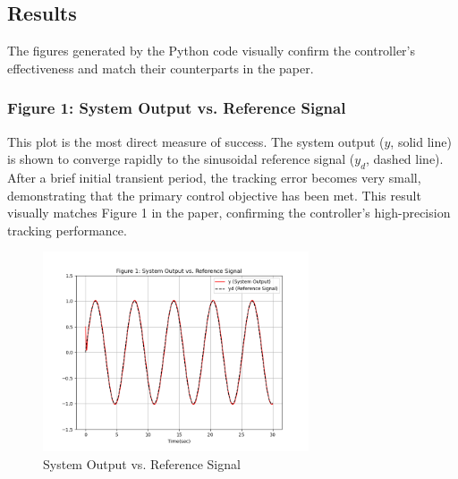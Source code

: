 \FloatBarrier
\subsection{Results}
The figures generated by the Python code visually confirm the controller's effectiveness and match their counterparts in the paper.

\subsubsection{Figure 1: System Output vs. Reference Signal}
 This plot is the most direct measure of success. The system output ($y$, solid line) is shown to converge rapidly to the sinusoidal reference signal ($y_d$, dashed line). After a brief initial transient period, the tracking error becomes very small, demonstrating that the primary control objective has been met. This result visually matches Figure 1 in the paper, confirming the controller's high-precision tracking performance.
\begin{figure}[H]
	\centering
	\includegraphics[width=0.7\textwidth]{images/sim1.png}
	\caption{System Output vs. Reference Signal}
	\label{fig:fig41}
\end{figure}

\clearpage
